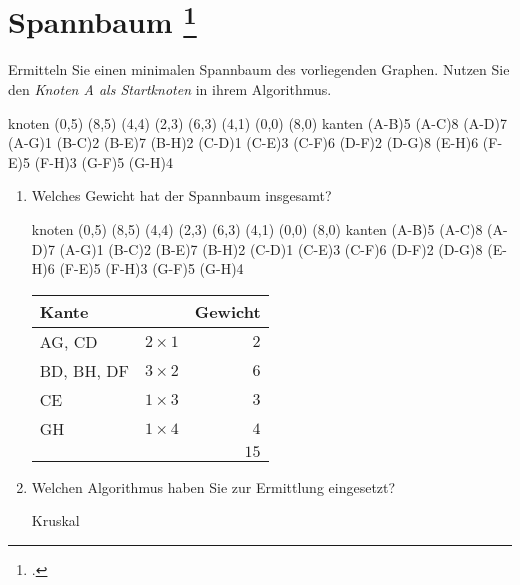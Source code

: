 \documentclass{lehramt-informatik-aufgabe}
\begin{document}

\section{Spannbaum
\footcite[Aufgabe 6]{aud:e-klausur}}

Ermitteln Sie einen minimalen Spannbaum des vorliegenden Graphen. Nutzen
Sie den \emph{Knoten A als Startknoten} in ihrem Algorithmus.

\graph knoten {
  (0,5)
  (8,5)
  (4,4)
  (2,3)
  (6,3)
  (4,1)
  (0,0)
  (8,0)
} kanten {
  \kante(A-B){5}
  \kante(A-C){8}
  \kante(A-D){7}
  \kante(A-G){1}
  \kante(B-C){2}
  \kante(B-E){7}
  \kante(B-H){2}
  \kante(C-D){1}
  \kante(C-E){3}
  \kante(C-F){6}
  \kante(D-F){2}
  \kante(D-G){8}
  \kante(E-H){6}
  \kante(F-E){5}
  \kante(F-H){3}
  \kante(G-F){5}
  \kante(G-H){4}
}

\begin{enumerate}
\item Welches Gewicht hat der Spannbaum insgesamt?

\begin{liAntwort}
\graph knoten {
  (0,5)
  (8,5)
  (4,4)
  (2,3)
  (6,3)
  (4,1)
  (0,0)
  (8,0)
} kanten {
  \kante(A-B){5}
  \kante(A-C){8}
  \kante(A-D){7}
  \KANTE(A-G){1}
  \KANTE(B-C){2}
  \kante(B-E){7}
  \KANTE(B-H){2}
  \KANTE(C-D){1}
  \KANTE(C-E){3}
  \kante(C-F){6}
  \KANTE(D-F){2}
  \kante(D-G){8}
  \kante(E-H){6}
  \kante(F-E){5}
  \kante(F-H){3}
  \kante(G-F){5}
  \KANTE(G-H){4}
}

\begin{center}
\begin{tabular}{|l|l|r|}
\hline
Kante & & Gewicht\\\hline\hline
AG, CD     & $2 \times 1$ & $2$\\
BD, BH, DF & $3 \times 2$ & $6$\\
CE         & $1 \times 3$ & $3$\\
GH         & $1 \times 4$ & $4$\\\hline
           &              & $15$\\\hline
\end{tabular}
\end{center}
\end{liAntwort}

\item Welchen Algorithmus haben Sie zur Ermittlung eingesetzt?
\begin{liAntwort}
Kruskal
\end{liAntwort}
\end{enumerate}
\end{document}
